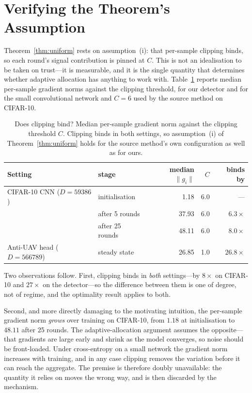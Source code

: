 \section{Verifying the Theorem's Assumption}
\label{sec:clipbinds}

Theorem~\ref{thm:uniform} rests on assumption~(i): that per-sample clipping
binds, so each round's signal contribution is pinned at $C$. This is not an
idealisation to be taken on trust---it is measurable, and it is the single
quantity that determines whether adaptive allocation has anything to work with.
Table~\ref{tab:clipbinds} reports median per-sample gradient norms against the
clipping threshold, for our detector and for the small convolutional network and
$C=6$ used by the source method on CIFAR-10.

\begin{table}[t]
\centering
\caption{Does clipping bind? Median per-sample gradient norm against the
clipping threshold $C$. Clipping binds in both settings, so assumption~(i) of
Theorem~\ref{thm:uniform} holds for the source method's own configuration as well
as for ours.}
\label{tab:clipbinds}
\begin{tabular}{llrrr}
\toprule
Setting & stage & median $\lVert g_i\rVert$ & $C$ & binds by \\
\midrule
CIFAR-10 CNN ($D=\num{59386}$) & initialisation & 1.18 & 6.0 & --- \\
                               & after 5 rounds & 37.93 & 6.0 & $6.3\times$ \\
                               & after 25 rounds & 48.11 & 6.0 & $8.0\times$ \\
\midrule
Anti-UAV head ($D=\num{566789}$) & steady state & 26.85 & 1.0 & $26.8\times$ \\
\bottomrule
\end{tabular}
\end{table}

Two observations follow. First, clipping binds in \emph{both} settings---by
$8\times$ on CIFAR-10 and $27\times$ on the detector---so the difference between
them is one of degree, not of regime, and the optimality result applies to both.

Second, and more directly damaging to the motivating intuition, the per-sample
gradient norm \emph{grows} over training on CIFAR-10, from $1.18$ at
initialisation to $48.11$ after 25 rounds. The adaptive-allocation argument
assumes the opposite---that gradients are large early and shrink as the model
converges, so noise should be front-loaded. Under cross-entropy on a small
network the gradient norm increases with training, and in any case clipping
removes the variation before it can reach the aggregate. The premise is
therefore doubly unavailable: the quantity it relies on moves the wrong way, and
is then discarded by the mechanism.

